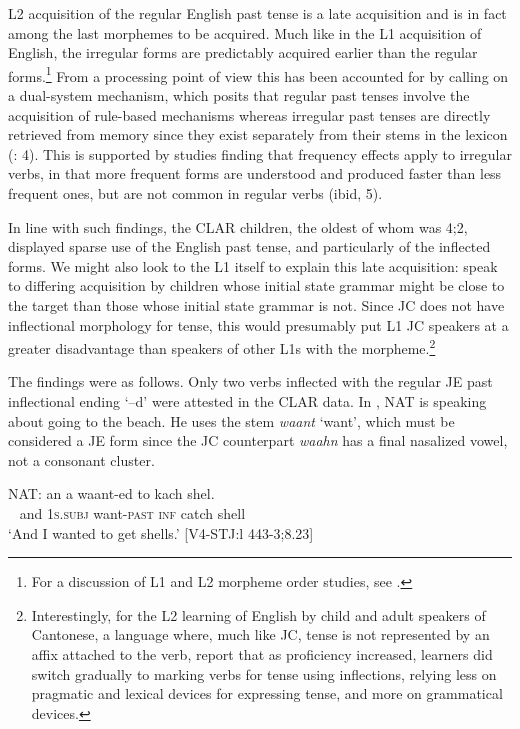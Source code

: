 \documentclass[output=paper,colorlinks,citecolor=brown]{langscibook}
\begin{document}
L2 acquisition of the regular English past tense is a late acquisition and is in fact among the last morphemes to be acquired. Much like in the L1 acquisition of English, the irregular forms are predictably acquired earlier than the regular forms.\footnote{For a discussion of L1 and L2 morpheme order studies, see \citet[67ff]{Meisel2011}.} From a processing point of view this has been accounted for by calling on a dual-system mechanism, which posits that regular past tenses involve the acquisition of rule-based mechanisms whereas irregular past tenses are directly retrieved from memory since they exist separately from their stems in the lexicon (\citealt{PliatsikasMarinis2013}: 4). This is supported by studies finding that frequency effects apply to irregular verbs, in that more frequent forms are understood and produced faster than less frequent ones, but are not common in regular verbs (ibid, 5).

In line with such findings, the CLAR children, the oldest of whom was 4;2, displayed sparse use of the English past tense, and particularly of the inflected forms. We might also look to the L1 itself to explain this late acquisition: \citet[698]{ParadisMarquis2008} speak to differing acquisition by children whose initial state grammar might be close to the target than those whose initial state grammar is not. Since JC does not have inflectional morphology for tense, this would presumably put L1 JC speakers at a greater disadvantage than speakers of other L1s with the morpheme.\footnote{Interestingly, for the L2 learning of English by child and adult speakers of Cantonese, a language where, much like JC, tense is not represented by an affix attached to the verb, \citet{YangHuang2004} report that as proficiency increased, learners did switch gradually to marking verbs for tense using inflections, relying less on pragmatic and lexical devices for expressing tense, and more on grammatical devices.}

The findings were as follows. Only two verbs inflected with the regular JE past inflectional ending ‘–d’ were attested in the CLAR data. In , NAT is speaking about going to the beach. He uses the stem \textit{waant} ‘want’, which must be considered a JE form since the JC counterpart \textit{waahn} has a final nasalized vowel, not a consonant cluster.

\ea \label{bkm:messamK:14}
\gll   NAT:   an   a            waant-ed     to   kach  shel. \\
~ and 1\textsc{s}.\textsc{subj} want-\textsc{past} \textsc{inf}  catch shell\\
\glt  \hphantom{NAT:} `And I wanted to get shells.’        [V4-STJ:l 443-3;8.23]
\z
\end{document}
